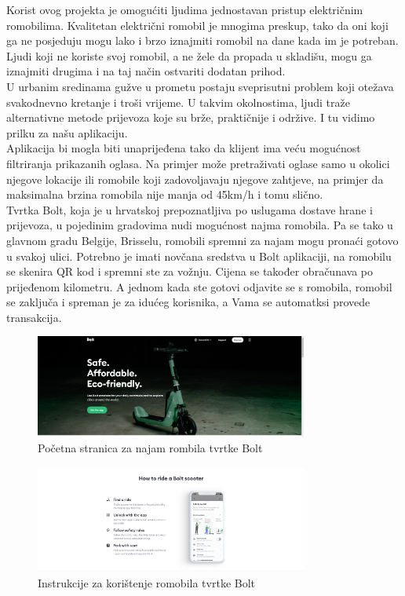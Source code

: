 		\indent Korist ovog projekta je omogućiti ljudima jednostavan pristup električnim romobilima. Kvalitetan električni romobil je mnogima preskup, tako da oni koji ga ne posjeduju mogu lako i brzo iznajmiti romobil na dane kada im je potreban. Ljudi koji ne koriste svoj romobil, a ne žele da propada u skladišu, mogu ga iznajmiti drugima i na taj način ostvariti dodatan prihod. \\
		\indent U urbanim sredinama gužve u prometu postaju sveprisutni problem koji otežava svakodnevno kretanje i troši vrijeme. U takvim okolnostima, ljudi traže alternativne metode prijevoza koje su brže, praktičnije i održive. I tu vidimo prilku za našu aplikaciju.\\
		\indent Aplikacija bi mogla biti unaprijeđena tako da klijent ima veću mogućnost filtriranja prikazanih oglasa. Na primjer može pretraživati oglase samo u okolici njegove lokacije ili romobile koji zadovoljavaju njegove zahtjeve, na primjer da maksimalna brzina romobila nije manja od 45km/h i tomu slično. \\
		
		\indent Tvrtka Bolt, koja je u hrvatskoj prepoznatljiva po uslugama dostave hrane i prijevoza, u pojedinim gradovima nudi mogućnost najma romobila. Pa se tako u glavnom gradu Belgije, Brisselu, romobili spremni za najam mogu pronaći gotovo u svakoj ulici. Potrebno je imati novčana sredstva u Bolt aplikaciji, na romobilu se skenira QR kod i spremni ste za vožnju. Cijena se također obračunava po prijeđenom kilometru. A jednom kada ste gotovi odjavite se s romobila, romobil se zaključa i spreman je za idućeg korisnika, a Vama se automatksi provede transakcija.
		
		
		\begin{figure}[h]
			\centering
			\includegraphics[width=0.8\textwidth]{bolt-1.png}
			\caption{Početna stranica za najam rombila tvrtke Bolt}
			\label{fig:your_label}
		\end{figure}
		
		\begin{figure}[t]
			\centering
			\includegraphics[width=0.8\textwidth]{bolt-2.png}
			\caption{Instrukcije za korištenje romobila tvrtke Bolt}
			\label{fig:your_label}
		\end{figure}
		
